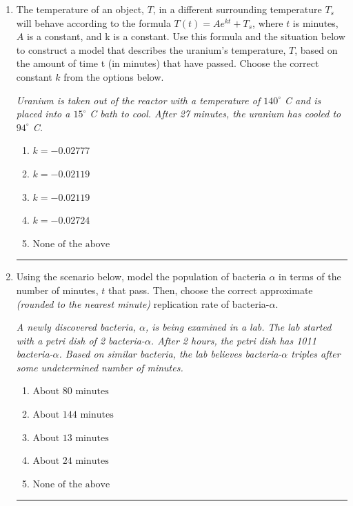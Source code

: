 \documentclass[14pt]{extbook}
\newcommand{\litem}[1]{\item#1\hspace*{-1cm}\rule{\textwidth}{0.4pt}}
\begin{document}
\begin{enumerate}
{\begin{enumerate}[label=\Alph*.]
\end{enumerate} }
\litem{
The temperature of an object, $T$, in a different surrounding temperature $T_s$ will behave according to the formula $T(t) = Ae^{kt} + T_s$, where $t$ is minutes, $A$ is a constant, and k is a constant. Use this formula and the situation below to construct a model that describes the uranium's temperature, $T$, based on the amount of time t (in minutes) that have passed. Choose the correct constant $k$ from the options below.
\begin{center}
    \textit{ Uranium is taken out of the reactor with a temperature of $140^{\circ}$ C and is placed into a $15^{\circ}$ C bath to cool. After 27 minutes, the uranium has cooled to $94^{\circ}$ C. }
\end{center}
\begin{enumerate}[label=\Alph*.]
\item \( k = -0.02777 \)
\item \( k = -0.02119 \)
\item \( k = -0.02119 \)
\item \( k = -0.02724 \)
\item \( \text{None of the above} \)

\end{enumerate} }
\litem{
Using the scenario below, model the population of bacteria $\alpha$ in terms of the number of minutes, $t$ that pass. Then, choose the correct approximate \textit{(rounded to the nearest minute)} replication rate of bacteria-$\alpha$.
\begin{center}
    \textit{ A newly discovered bacteria, $\alpha$, is being examined in a lab. The lab started with a petri dish of 2 bacteria-$\alpha$. After 2 hours, the petri dish has 1011 bacteria-$\alpha$. Based on similar bacteria, the lab believes bacteria-$\alpha$ triples after some undetermined number of minutes. }
\end{center}
\begin{enumerate}[label=\Alph*.]
\item \( \text{About } 80 \text{ minutes} \)
\item \( \text{About } 144 \text{ minutes} \)
\item \( \text{About } 13 \text{ minutes} \)
\item \( \text{About } 24 \text{ minutes} \)
\item \( \text{None of the above} \)


\end{enumerate}}
\end{enumerate}
\end{document}

